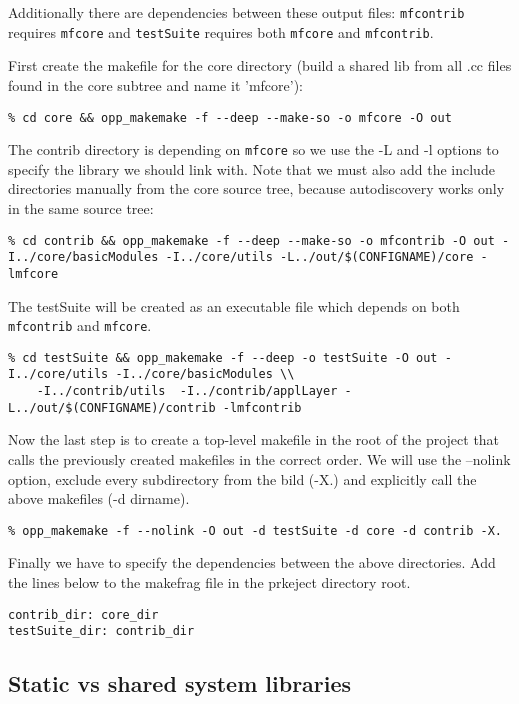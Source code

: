 Additionally there are dependencies between these output files: \texttt{mfcontrib}
requires \texttt{mfcore} and \texttt{testSuite} requires both \texttt{mfcore}
and \texttt{mfcontrib}.

First create the makefile for the core directory (build a shared lib from all .cc files
found in the core subtree and name it 'mfcore'):

\begin{verbatim}
% cd core && opp_makemake -f --deep --make-so -o mfcore -O out
\end{verbatim}

The contrib directory is depending on \texttt{mfcore} so we use the -L and -l options
to specify the library we should link with. Note that we must also add 
the include directories manually from the core source tree, because autodiscovery works only 
in the same source tree:
\begin{verbatim}
% cd contrib && opp_makemake -f --deep --make-so -o mfcontrib -O out -I../core/basicModules -I../core/utils -L../out/$(CONFIGNAME)/core -lmfcore
\end{verbatim}

The testSuite will be created as an executable file which depends on both 
\texttt{mfcontrib} and \texttt{mfcore}.
\begin{verbatim}
% cd testSuite && opp_makemake -f --deep -o testSuite -O out -I../core/utils -I../core/basicModules \\
    -I../contrib/utils  -I../contrib/applLayer -L../out/$(CONFIGNAME)/contrib -lmfcontrib
\end{verbatim}

Now the last step is to create a top-level makefile in the root of the project that 
calls the previously created makefiles in the correct order. We will use the 
--nolink option, exclude every subdirectory from the bild (-X.) and explicitly call 
the above makefiles (-d dirname).
\begin{verbatim}
% opp_makemake -f --nolink -O out -d testSuite -d core -d contrib -X.
\end{verbatim}

Finally we have to specify the dependencies between the above directories. Add the lines below to the makefrag file
in the prkeject directory root.
\begin{verbatim}
contrib_dir: core_dir
testSuite_dir: contrib_dir
\end{verbatim}

\subsection{Static vs shared {\opp} system libraries}


